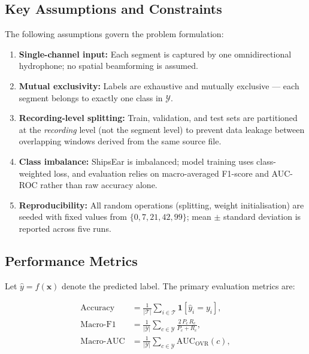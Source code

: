 \documentclass[conference]{IEEEtran}
\begin{document}
\subsection{Key Assumptions and Constraints}

The following assumptions govern the problem formulation:

\begin{enumerate}
  \item \textbf{Single-channel input:} Each segment is captured by one
        omnidirectional hydrophone; no spatial beamforming is assumed.

  \item \textbf{Mutual exclusivity:} Labels are exhaustive and mutually
        exclusive --- each segment belongs to exactly one class in
        $\mathcal{Y}$.

  \item \textbf{Recording-level splitting:} Train, validation, and test sets
        are partitioned at the \emph{recording} level (not the segment level)
        to prevent data leakage between overlapping windows derived from the
        same source file.

  \item \textbf{Class imbalance:} ShipsEar is imbalanced; model training uses
        class-weighted loss, and evaluation relies on macro-averaged F1-score
        and AUC-ROC rather than raw accuracy alone.

  \item \textbf{Reproducibility:} All random operations (splitting,
        weight initialisation) are seeded with fixed values from
        $\{0, 7, 21, 42, 99\}$; mean $\pm$ standard deviation is reported
        across five runs.
\end{enumerate}

\subsection{Performance Metrics}

Let $\hat{y} = f(\mathbf{x})$ denote the predicted label. The primary
evaluation metrics are:

\begin{align}
  \text{Accuracy} &= \frac{1}{|\mathcal{T}|}\sum_{i\in\mathcal{T}}
                     \mathbf{1}[\hat{y}_i = y_i], \label{eq:acc} \\[4pt]
  \text{Macro-F1} &= \frac{1}{|\mathcal{Y}|}\sum_{c\in\mathcal{Y}}
                     \frac{2\,P_c\,R_c}{P_c + R_c}, \label{eq:f1} \\[4pt]
  \text{Macro-AUC} &= \frac{1}{|\mathcal{Y}|}\sum_{c\in\mathcal{Y}}
                      \mathrm{AUC}_{\mathrm{OVR}}(c), \label{eq:auc}
\end{align}
\end{document}
